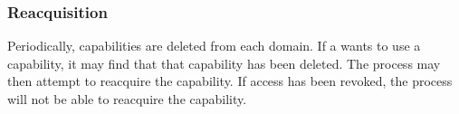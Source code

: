 \subsubsection{Reacquisition}\label{subsubsec:Capability_Revokation_Reacquisition}
Periodically, capabilities are deleted from each domain.
If a  wants to use a capability, it may find that that capability has been deleted.
The process may then attempt to reacquire the capability.
If access has been revoked, the process will not be able to reacquire the capability.


